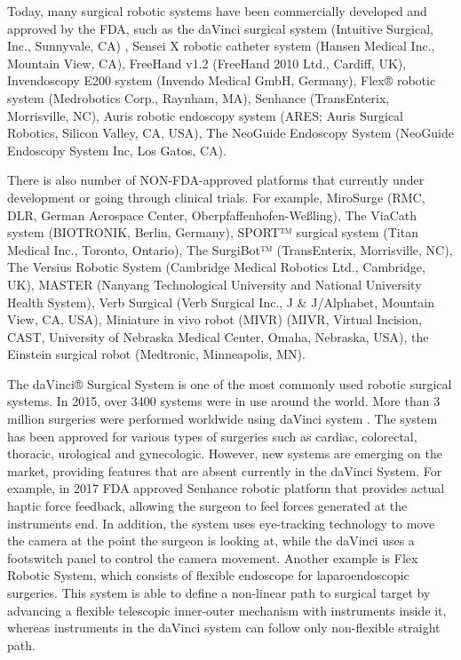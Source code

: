 Today, many surgical robotic systems have been commercially developed and approved by the FDA, such as the daVinci surgical system (Intuitive Surgical, Inc., Sunnyvale, CA) , Sensei X robotic catheter system (Hansen Medical Inc., Mountain View, CA), FreeHand v1.2 (FreeHand 2010 Ltd., Cardiff, UK), Invendoscopy E200 system (Invendo Medical GmbH, Germany), Flex® robotic system (Medrobotics Corp., Raynham, MA), Senhance (TransEnterix, Morrisville, NC), Auris robotic endoscopy system (ARES; Auris Surgical Robotics, Silicon Valley, CA, USA), The NeoGuide Endoscopy System (NeoGuide Endoscopy System Inc, Los Gatos, CA). \cite{lanfranco_robotic_2004,peters_review_2018} 

There is also number of NON-FDA-approved platforms that currently under development or going through clinical trials. For example, MiroSurge (RMC, DLR, German Aerospace Center, Oberpfaffenhofen-Weßling), The ViaCath system (BIOTRONIK, Berlin, Germany), SPORT™ surgical system (Titan Medical Inc., Toronto, Ontario), The SurgiBot™ (TransEnterix, Morrisville, NC), The Versius Robotic System (Cambridge Medical Robotics Ltd., Cambridge, UK), MASTER (Nanyang Technological University and National University Health System), Verb Surgical (Verb Surgical Inc., J \& J/Alphabet, Mountain View, CA, USA), Miniature in vivo robot (MIVR) (MIVR, Virtual Incision, CAST, University of Nebraska Medical Center, Omaha, Nebraska, USA), the Einstein surgical robot (Medtronic, Minneapolis, MN). \cite{peters_review_2018}

The daVinci® Surgical System is one of the most commonly used robotic surgical systems. In 2015, over 3400 systems were in use around the world. More than 3 million surgeries were performed worldwide using daVinci system \cite{_intuitive_2018}. The system has been approved for various types of surgeries such as cardiac, colorectal, thoracic, urological and gynecologic. However, new systems are emerging on the market, providing features that are absent currently in the daVinci System. For example, in 2017 FDA approved Senhance robotic platform that provides actual haptic force feedback, allowing the surgeon to feel forces generated at the instruments end. In addition, the system uses eye-tracking technology to move the camera at the point the surgeon is looking at, while the daVinci uses a footswitch panel to control the camera movement. Another example is Flex Robotic System, which consists of flexible endoscope for laparoendoscopic surgeries. This system is able to define a non-linear path to surgical target by advancing a flexible telescopic inner-outer mechanism with instruments inside it, whereas instruments in the daVinci system can follow only non-flexible straight path. \cite{peters_review_2018}



